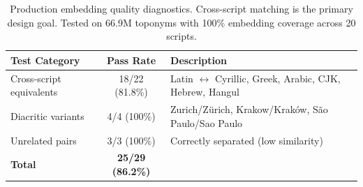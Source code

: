 \documentclass[11pt,a4paper]{article}
\begin{document}
\begin{table}[p]
\centering
\small
\begin{tabular}{p{3.2cm} c p{5.8cm}}
\toprule
\textbf{Test Category} & \textbf{Pass Rate} & \textbf{Description} \\
\midrule
Cross-script equivalents & 18/22 (81.8\%) & Latin $\leftrightarrow$ Cyrillic, Greek, Arabic, CJK, Hebrew, Hangul \\
Diacritic variants & 4/4 (100\%) & Zurich/Zürich, Krakow/Kraków, São Paulo/Sao Paulo \\
Unrelated pairs & 3/3 (100\%) & Correctly separated (low similarity) \\
\midrule
\textbf{Total} & \textbf{25/29 (86.2\%)} & \\
\bottomrule
\end{tabular}
\caption{Production embedding quality diagnostics. Cross-script matching is the primary design goal. Tested on 66.9M toponyms with 100\% embedding coverage across 20 scripts.}
\label{tab:embedding-quality}
\end{table}

\clearpage
\end{document}
